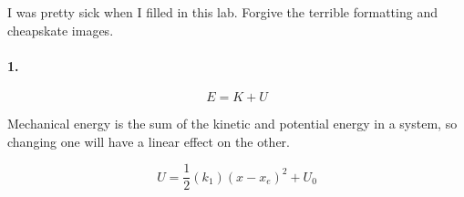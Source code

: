 

\usepackage{enumitem}
\usepackage{graphicx}
\graphicspath{ {./lab05images/} }


\renewcommand\assignment{Lab 5: Conservation of Mechanical Energy , 2/28/2023, Partners: Maite Valentin-Lugo, Seth Waln}

    I was pretty sick when I filled in this lab. Forgive the terrible formatting and cheapskate images.

    \paragraph*{1.}

    \begin{equation*}
        E = K + U
    \end{equation*}

    Mechanical energy is the sum of the kinetic and potential energy in a system, so changing one will have a linear effect on the other.

    \begin{equation*}
        U = \frac{1}{2}(k_{1})(x-x_{e})^{2} + U_{0}
    \end{equation*}


